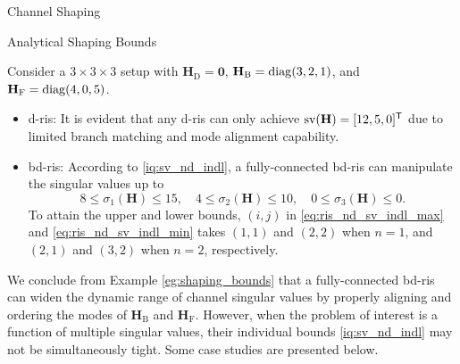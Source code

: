 \documentclass[journal]{IEEEtran}
\begin{document}
\begin{section}{Channel Shaping}
\begin{subsection}{Analytical Shaping Bounds}
		\begin{example}
			\label{eg:shaping_bounds}
			Consider a $3 \times 3 \times 3$ setup with $\mathbf{H}_\mathrm{D} = \mathbf{0}$, $\mathbf{H}_\mathrm{B} = \operatorname{diag}(3, 2, 1)$, and $\mathbf{H}_\mathrm{F} = \operatorname{diag}(4, 0, 5)$.
			\begin{itemize}
				\item \gls{d}-\gls{ris}: It is evident that any \gls{d}-\gls{ris} can only achieve $\operatorname{sv}(\mathbf{H}) = [12, 5, 0]^\mathsf{T}$ due to limited branch matching and mode alignment capability.
				\item \gls{bd}-\gls{ris}: According to \eqref{iq:sv_nd_indl}, a fully-connected \gls{bd}-\gls{ris} can manipulate the singular values up to
					\begin{equation*}
						8 \le \sigma_1(\mathbf{H}) \le 15, \quad 4 \le \sigma_2(\mathbf{H}) \le 10, \quad 0 \le \sigma_3(\mathbf{H}) \le 0.
					\end{equation*}
					To attain the upper and lower bounds, $(i,j)$ in \eqref{eq:ris_nd_sv_indl_max} and \eqref{eq:ris_nd_sv_indl_min} takes $(1, 1)$ and $(2, 2)$ when $n=1$, and $(2, 1)$ and $(3, 2)$ when $n=2$, respectively.
			\end{itemize}
		\end{example}

		We conclude from Example \ref{eg:shaping_bounds} that a fully-connected \gls{bd}-\gls{ris} can widen the dynamic range of channel singular values by properly aligning and ordering the modes of $\mathbf{H}_\mathrm{B}$ and $\mathbf{H}_\mathrm{F}$.
		However, when the problem of interest is a function of multiple singular values, their individual bounds \eqref{iq:sv_nd_indl} may not be simultaneously tight.
		Some case studies are presented below.


\end{subsection}
\end{section}
\end{document}

